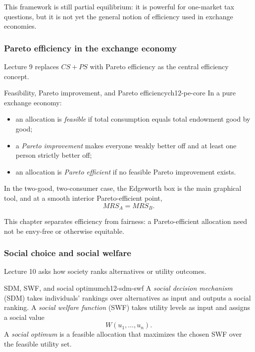 This framework is still partial equilibrium: it is powerful for one-market tax questions, but it is not yet the general notion of efficiency used in exchange economies.

\subsubsection{Pareto efficiency in the exchange economy}

Lecture 9 replaces \(CS+PS\) with Pareto efficiency as the central efficiency concept.

\begin{definition}{Feasibility, Pareto improvement, and Pareto efficiency}{ch12-pe-core}
In a pure exchange economy:
\begin{itemize}
    \item an allocation is \emph{feasible} if total consumption equals total endowment good by good;
    \item a \emph{Pareto improvement} makes everyone weakly better off and at least one person strictly better off;
    \item an allocation is \emph{Pareto efficient} if no feasible Pareto improvement exists.
\end{itemize}
In the two-good, two-consumer case, the Edgeworth box is the main graphical tool, and at a smooth interior Pareto-efficient point,
\[
MRS_A=MRS_B.
\]
\end{definition}

This chapter separates efficiency from fairness: a Pareto-efficient allocation need not be envy-free or otherwise equitable.

\subsubsection{Social choice and social welfare}

Lecture 10 asks how society ranks alternatives or utility outcomes.

\begin{definition}{SDM, SWF, and social optimum}{ch12-sdm-swf}
A \emph{social decision mechanism} (SDM) takes individuals' rankings over alternatives as input and outputs a social ranking. A \emph{social welfare function} (SWF) takes utility levels as input and assigns a social value
\[
W(u_1,\dots,u_n).
\]
A \emph{social optimum} is a feasible allocation that maximizes the chosen SWF over the feasible utility set.
\end{definition}

